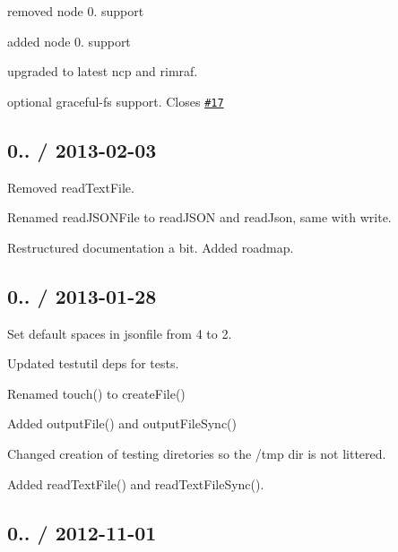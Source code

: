 \begin{DoxyItemize}
\item removed node 0. support
\item added node 0. support
\item upgraded to latest {\ttfamily ncp} and {\ttfamily rimraf}.
\item optional {\ttfamily graceful-\/fs} support. Closes \href{https://github.com/jprichardson/node-fs-extra/issues/17}{\tt \#17}
\end{DoxyItemize}

\subsection*{0.. / 2013-\/02-\/03 }


\begin{DoxyItemize}
\item Removed {\ttfamily read\+Text\+File}.
\item Renamed {\ttfamily read\+J\+S\+O\+N\+File} to {\ttfamily read\+J\+S\+ON} and {\ttfamily read\+Json}, same with write.
\item Restructured documentation a bit. Added roadmap.
\end{DoxyItemize}

\subsection*{0.. / 2013-\/01-\/28 }


\begin{DoxyItemize}
\item Set default spaces in {\ttfamily jsonfile} from 4 to 2.
\item Updated {\ttfamily testutil} deps for tests.
\item Renamed {\ttfamily touch()} to {\ttfamily create\+File()}
\item Added {\ttfamily output\+File()} and {\ttfamily output\+File\+Sync()}
\item Changed creation of testing diretories so the /tmp dir is not littered.
\item Added {\ttfamily read\+Text\+File()} and {\ttfamily read\+Text\+File\+Sync()}.
\end{DoxyItemize}

\subsection*{0.. / 2012-\/11-\/01 }


